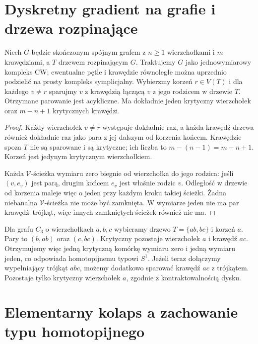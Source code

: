 \section{Dyskretny gradient na grafie i drzewa rozpinające}
\label{sec:tg-forman-on-graph}

\begin{twierdzenie}
\label{thm:tg-forman-tree}
Niech $G$ będzie skończonym spójnym grafem z $n\ge1$
wierzchołkami i $m$ krawędziami, a $T$ drzewem
rozpinającym $G$. Traktujemy $G$ jako jednowymiarowy
kompleks CW; ewentualne pętle i krawędzie równoległe
można uprzednio podzielić na prosty kompleks symplicjalny.
Wybierzmy korzeń $r\in V(T)$ i dla każdego $v\ne r$
sparujmy $v$ z krawędzią łączącą $v$ z jego rodzicem
w drzewie $T$. Otrzymane parowanie jest acykliczne.
Ma dokładnie jeden krytyczny wierzchołek oraz
$m-n+1$ krytycznych krawędzi.
\end{twierdzenie}

\begin{proof}
Każdy wierzchołek $v\ne r$ występuje dokładnie raz,
a każda krawędź drzewa również dokładnie raz jako
para z jej dalszym od korzenia końcem. Krawędzie
spoza $T$ nie są sparowane i są krytyczne; ich liczba
to $m-(n-1)=m-n+1$. Korzeń jest jedynym krytycznym
wierzchołkiem.

Każda $\mathcal V$-ścieżka wymiaru zero biegnie
od wierzchołka do jego rodzica: jeśli
$(v,e_v)$ jest parą, drugim końcem $e_v$ jest
właśnie rodzic $v$. Odległość w drzewie od korzenia
maleje więc o jeden przy każdym kroku takiej ścieżki.
Żadna niebanalna $\mathcal V$-ścieżka nie może być
zamknięta. W wymiarze jeden nie ma par krawędź--trójkąt,
więc innych zamkniętych ścieżek również nie ma.
\end{proof}

\begin{przyklad}
Dla grafu $C_3$ o wierzchołkach $a,b,c$ wybieramy
drzewo $T=\{ab,bc\}$ i korzeń $a$.
Pary to $(b,ab)$ oraz $(c,bc)$. Krytyczny pozostaje
wierzchołek $a$ i krawędź $ac$. Otrzymujemy więc
jedną krytyczną komórkę wymiaru zero i jedną
wymiaru jeden, co odpowiada homotopijnemu typowi $S^1$.
Jeżeli teraz dołączymy wypełniający trójkąt $abc$,
możemy dodatkowo sparować krawędź $ac$ z trójkątem.
Pozostaje tylko krytyczny wierzchołek $a$, zgodnie
z kontraktowalnością dysku.
\end{przyklad}

\section{Elementarny kolaps a zachowanie typu homotopijnego}
\label{sec:tg-forman-collapse}

